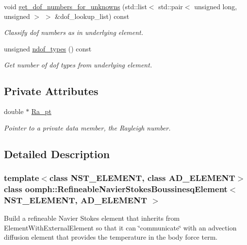 \begin{DoxyCompactItemize}
void \hyperlink{classoomph_1_1RefineableNavierStokesBoussinesqElement_aab581709145cc3e9a4da5c5417d1c50f}{get\+\_\+dof\+\_\+numbers\+\_\+for\+\_\+unknowns} (std\+::list$<$ std\+::pair$<$ unsigned long, unsigned $>$ $>$ \&dof\+\_\+lookup\+\_\+list) const
\begin{DoxyCompactList}\small\item\em Classify dof numbers as in underlying element. \end{DoxyCompactList}\item 
unsigned \hyperlink{classoomph_1_1RefineableNavierStokesBoussinesqElement_a8e494f3887499d79d8c30c7434494b47}{ndof\+\_\+types} () const
\begin{DoxyCompactList}\small\item\em Get number of dof types from underlying element. \end{DoxyCompactList}\end{DoxyCompactItemize}
\subsection*{Private Attributes}
\begin{DoxyCompactItemize}
\item 
double $\ast$ \hyperlink{classoomph_1_1RefineableNavierStokesBoussinesqElement_a4ea4706d0f735b1986287038191ee4e9}{Ra\+\_\+pt}
\begin{DoxyCompactList}\small\item\em Pointer to a private data member, the Rayleigh number. \end{DoxyCompactList}\end{DoxyCompactItemize}


\subsection{Detailed Description}
\subsubsection*{template$<$class N\+S\+T\+\_\+\+E\+L\+E\+M\+E\+NT, class A\+D\+\_\+\+E\+L\+E\+M\+E\+NT$>$\newline
class oomph\+::\+Refineable\+Navier\+Stokes\+Boussinesq\+Element$<$ N\+S\+T\+\_\+\+E\+L\+E\+M\+E\+N\+T, A\+D\+\_\+\+E\+L\+E\+M\+E\+N\+T $>$}

Build a refineable Navier Stokes element that inherits from Element\+With\+External\+Element so that it can \char`\"{}communicate\char`\"{} with an advection diffusion element that provides the temperature in the body force term. 

